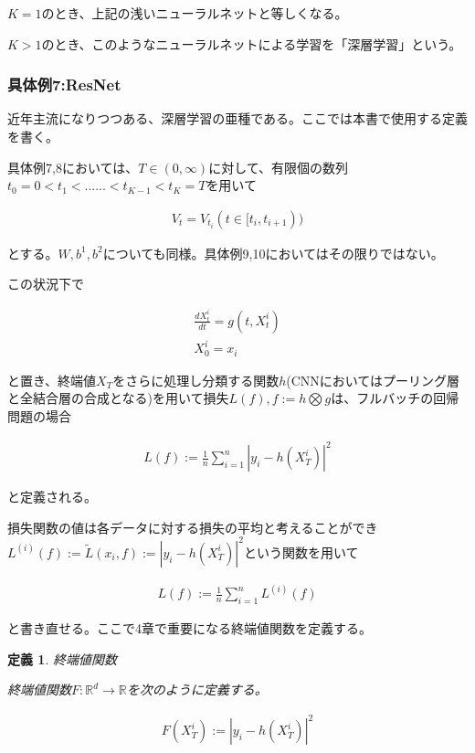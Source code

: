 \documentclass{jsarticle}
\newtheorem{defi}{定義}[section]
\begin{document}
$K=1$のとき、上記の浅いニューラルネットと等しくなる。

$K>1$のとき、このようなニューラルネットによる学習を「深層学習」という。


\subsubsection{具体例7:ResNet}
近年主流になりつつある、深層学習の亜種である。ここでは本書で使用する定義を書く。


具体例7,8においては、$T\in(0,\infty)$に対して、有限個の数列$t_0=0<t_1<......<t_{K-1}<t_K=T$を用いて

\begin{align}
V_t=V_{t_i} (t\in[t_i,t_{i+1}))
\end{align}

とする。$W,b^1,b^2$についても同様。具体例9,10においてはその限りではない。

この状況下で

\begin{align}
\frac{dX^i_t}{dt}=g(t,X^i_t)\\
X^i_0=x_i
\end{align}

と置き、終端値$X_T$をさらに処理し分類する関数$h$(CNNにおいてはプーリング層と全結合層の合成となる)を用いて損失$L(f),f:=h\bigotimes g$は、フルバッチの回帰問題の場合

\begin{align}
L(f):=\frac{1}{n}\sum^n_{i=1}|y_i-h(X^i_T)|^2
\end{align}

と定義される。

損失関数の値は各データに対する損失の平均と考えることができ$L^{(i)}(f):=\tilde{L}(x_i,f):=|y_i-h(X^i_T)|^2$という関数を用いて

\begin{align}
L(f):=\frac{1}{n}\sum^n_{i=1} L^{(i)}(f)
\end{align}

と書き直せる。ここで4章で重要になる終端値関数を定義する。

\begin{defi} 終端値関数


終端値関数$F:\mathbb{R}^d\to\mathbb{R}$を次のように定義する。

\begin{align}
F(X^i_T):=|y_i-h(X^i_T)|^2
\end{align}


\end{defi}
\end{document}
